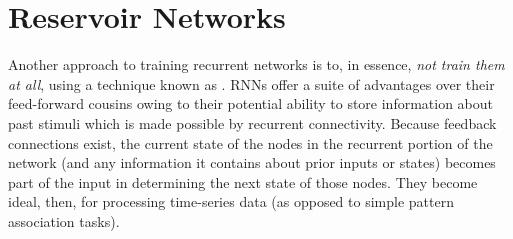 \chapter{Reservoir Networks}\label{ch_reservoir}







Another approach to training recurrent networks is to, in essence, \emph{not train them at all}, using a technique known as . RNNs offer a suite of advantages over their feed-forward cousins owing to their potential ability to store information about past stimuli which is made possible by recurrent connectivity. Because feedback connections exist, the current state of the nodes in the recurrent portion of the network (and any information it contains about prior inputs or states) becomes part of the input in determining the next state of those nodes. They become ideal, then, for processing time-series data (as opposed to simple pattern association tasks).

